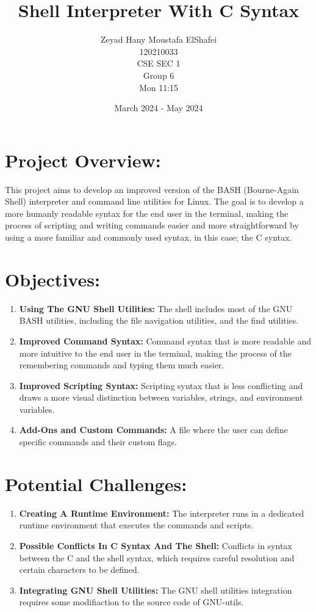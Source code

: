 \documentclass{article}
\title{Shell Interpreter With C Syntax}
\author{Zeyad Hany Moustafa ElShafei
      \\120210033
      \\CSE SEC 1
      \\Group 6
      \\Mon 11:15}
\date{March 2024 - May 2024}
\begin{document}
\maketitle

\section*{Project Overview:}
This project aims to develop an improved version of the BASH (Bourne-Again Shell) 
interpreter and command line utilities for Linux. The goal is to develop a more
humanly readable syntax for the end user in the terminal, making the process of scripting
and writing commands easier and more straightforward by using a more familiar and 
commonly used syntax, in this case; the C syntax.

\section*{Objectives:}

\begin{enumerate}

\item \textbf{Using The GNU Shell Utilities: } The shell includes most of the GNU BASH utilities,
including the file navigation utilities, and the find utilities.

\item \textbf{Improved Command Syntax: } Command syntax that is more readable and more intuitive to
the end user in the terminal, making the process of the remembering commands and typing them much
easier.

\item \textbf{Improved Scripting Syntax: } Scripting syntax that is less conflicting and draws a
more visual distinction between variables, strings, and environment variables.

\item \textbf{Add-Ons and Custom Commands: } A file where the user can define specific commands and 
their custom flags.

\end{enumerate}

\section*{Potential Challenges:}

\begin{enumerate}

\item \textbf{Creating A Runtime Environment: } The interpreter runs in a dedicated runtime environment that executes the 
commands and scripts.  

\item \textbf{Possible Conflicts In C Syntax And The Shell: } Conflicts in syntax between the C and the shell
syntax, which requires careful resolution and certain characters to be defined. 

\item \textbf{Integrating GNU Shell Utilities: } The GNU shell utilities integration requires some modifiaction to
the source code of GNU-utils.

\end{enumerate}
\end{document}
